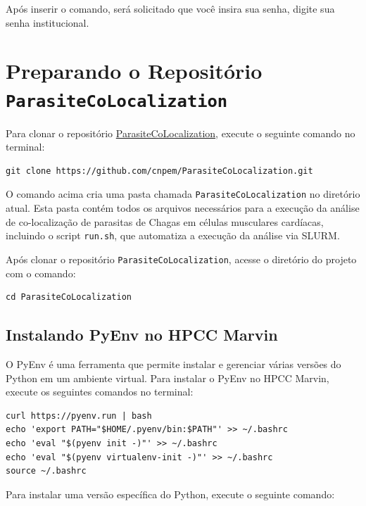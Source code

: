 \documentclass{article}
\begin{document}
Após inserir o comando, será solicitado que você insira sua senha, digite sua senha institucional.

\section{Preparando o Repositório \texttt{ParasiteCoLocalization}}

Para clonar o repositório \href{https://github.com/cnpem/ParasiteCoLocalization}{ParasiteCoLocalization}, execute o seguinte comando no terminal:

\begin{verbatim}
git clone https://github.com/cnpem/ParasiteCoLocalization.git
\end{verbatim}

O comando acima cria uma pasta chamada \texttt{ParasiteCoLocalization} no diretório atual. Esta pasta contém todos os arquivos necessários para a execução da análise de co-localização de parasitas de Chagas em células musculares cardíacas, incluindo o script \texttt{run.sh}, que automatiza a execução da análise via SLURM.

Após clonar o repositório \texttt{ParasiteCoLocalization}, acesse o diretório do projeto com o comando:

\begin{verbatim}
cd ParasiteCoLocalization
\end{verbatim}

\subsection{Instalando PyEnv no HPCC Marvin}

O PyEnv é uma ferramenta que permite instalar e gerenciar várias versões do Python em um ambiente virtual. Para instalar o PyEnv no HPCC Marvin, execute os seguintes comandos no terminal:

\begin{verbatim}
curl https://pyenv.run | bash
echo 'export PATH="$HOME/.pyenv/bin:$PATH"' >> ~/.bashrc
echo 'eval "$(pyenv init -)"' >> ~/.bashrc
echo 'eval "$(pyenv virtualenv-init -)"' >> ~/.bashrc
source ~/.bashrc
\end{verbatim}

Para instalar uma versão específica do Python, execute o seguinte comando:
\end{document}
